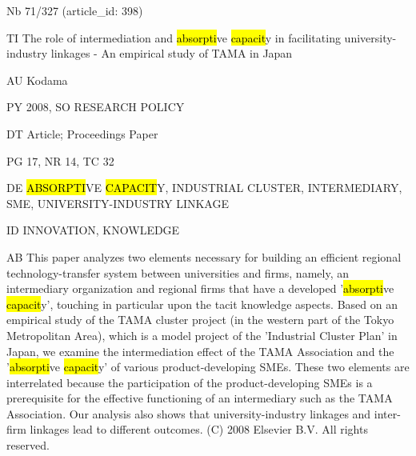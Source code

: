 \documentclass[a4paper]{article}
\begin{document}
\vspace*{-2cm}
Nb \tabto{0cm}71/327 (article\_id: 398)\par
TI \tabto{0cm}The role of intermediation and \hl{absorpti}ve \hl{capacit}y in facilitating university-industry linkages - An empirical study of TAMA in Japan\par
AU \tabto{0cm}Kodama\par
PY \tabto{0cm}2008, SO RESEARCH POLICY\par
DT \tabto{0cm}Article; Proceedings Paper\par
PG \tabto{0cm}17, NR 14, TC 32\par
DE \tabto{0cm}\hl{ABSORPTI}VE \hl{CAPACIT}Y, INDUSTRIAL CLUSTER, INTERMEDIARY, SME, UNIVERSITY-INDUSTRY LINKAGE\par
ID \tabto{0cm}INNOVATION, KNOWLEDGE\par
AB \tabto{0cm}This paper analyzes two elements necessary for building an efficient regional technology-transfer system between universities and firms, namely, an intermediary organization and regional firms that have a developed '\hl{absorpti}ve \hl{capacit}y', touching in particular upon the tacit knowledge aspects. Based on an empirical study of the TAMA cluster project (in the western part of the Tokyo Metropolitan Area), which is a model project of the 'Industrial Cluster Plan' in Japan, we examine the intermediation effect of the TAMA Association and the '\hl{absorpti}ve \hl{capacit}y' of various product-developing SMEs. These two elements are interrelated because the participation of the product-developing SMEs is a prerequisite for the effective functioning of an intermediary such as the TAMA Association. Our analysis also shows that university-industry linkages and inter-firm linkages lead to different outcomes. (C) 2008 Elsevier B.V. All rights reserved.\par
\clearpage
\end{document}
